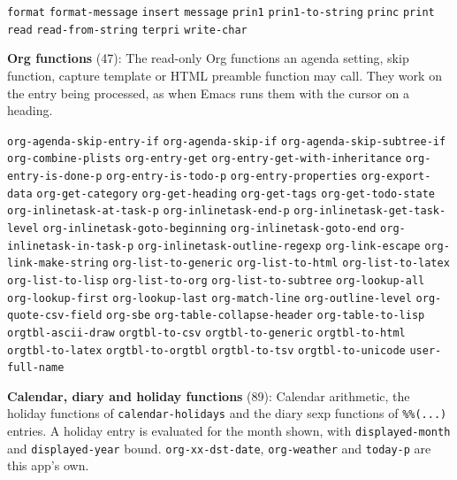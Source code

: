 \documentclass[11pt]{article}
\begin{document}
\texttt{format} \texttt{format-message} \texttt{insert} \texttt{message} \texttt{prin1} \texttt{prin1-to-string} \texttt{princ} \texttt{print} \texttt{read} \texttt{read-from-string} \texttt{terpri} \texttt{write-char}

\textbf{Org functions} (47): The read-only Org functions an agenda setting, skip function, capture template or HTML preamble function may call. They work on the entry being processed, as when Emacs runs them with the cursor on a heading.

\texttt{org-agenda-skip-entry-if} \texttt{org-agenda-skip-if} \texttt{org-agenda-skip-subtree-if} \texttt{org-combine-plists} \texttt{org-entry-get} \texttt{org-entry-get-with-inheritance} \texttt{org-entry-is-done-p} \texttt{org-entry-is-todo-p} \texttt{org-entry-properties} \texttt{org-export-data} \texttt{org-get-category} \texttt{org-get-heading} \texttt{org-get-tags} \texttt{org-get-todo-state} \texttt{org-inlinetask-at-task-p} \texttt{org-inlinetask-end-p} \texttt{org-inlinetask-get-task-level} \texttt{org-inlinetask-goto-beginning} \texttt{org-inlinetask-goto-end} \texttt{org-inlinetask-in-task-p} \texttt{org-inlinetask-outline-regexp} \texttt{org-link-escape} \texttt{org-link-make-string} \texttt{org-list-to-generic} \texttt{org-list-to-html} \texttt{org-list-to-latex} \texttt{org-list-to-lisp} \texttt{org-list-to-org} \texttt{org-list-to-subtree} \texttt{org-lookup-all} \texttt{org-lookup-first} \texttt{org-lookup-last} \texttt{org-match-line} \texttt{org-outline-level} \texttt{org-quote-csv-field} \texttt{org-sbe} \texttt{org-table-collapse-header} \texttt{org-table-to-lisp} \texttt{orgtbl-ascii-draw} \texttt{orgtbl-to-csv} \texttt{orgtbl-to-generic} \texttt{orgtbl-to-html} \texttt{orgtbl-to-latex} \texttt{orgtbl-to-orgtbl} \texttt{orgtbl-to-tsv} \texttt{orgtbl-to-unicode} \texttt{user-full-name}

\textbf{Calendar, diary and holiday functions} (89): Calendar arithmetic, the holiday functions of \texttt{calendar-holidays} and the diary sexp functions of \texttt{\%\%(...)} entries. A holiday entry is evaluated for the month shown, with \texttt{displayed-month} and \texttt{displayed-year} bound. \texttt{org-xx-dst-date}, \texttt{org-weather} and \texttt{today-p} are this app's own.
\end{document}

